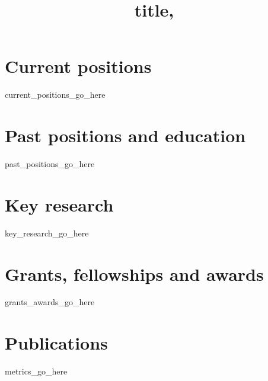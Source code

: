 \documentclass[11pt,a4paper,roman]{moderncv} %
\title{{{title}}, \newline {{{subtitle}}}}
\begin{document}
\makecvtitle %


\section{Current positions}
{{current_positions_go_here}}



\section{Past positions and education}
{{past_positions_go_here}}




\section{Key research}
{{key_research_go_here}}

\section{Grants, fellowships and awards}
    {{grants_awards_go_here}}


\section{Publications}
    {{metrics_go_here}}
\end{document}

